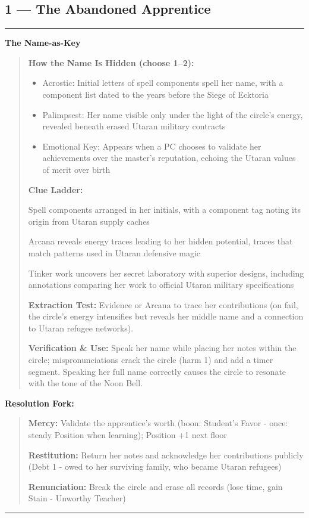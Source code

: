 \documentclass[18pt, letterpaper, twoside]{article}
\newenvironment{floorbox}[1]{%
    \begin{center}
    \begin{minipage}{0.95\textwidth}
    \subsection*{#1}
    \vspace{-0.5em}
    \rule{\textwidth}{0.5pt}
    \vspace{0.5em}
}{%
    \vspace{0.5em}
    \rule{\textwidth}{0.5pt}
    \end{minipage}
    \end{center}
}
\newenvironment{gmnote}[1]{%
    \vspace{0.5em}
    \noindent\textbf{#1}
    \begin{quote}
}{%
    \end{quote}
    \vspace{0.5em}
}
\newenvironment{resolutionbox}{%
    \vspace{0.5em}
    \noindent\textbf{Resolution Fork:}
    \begin{quote}
}{%
    \end{quote}
    \vspace{0.5em}
}
\begin{document}
\begin{floorbox}{1 --- The Abandoned Apprentice}
\begin{gmnote}{The Name-as-Key}
\textbf{How the Name Is Hidden (choose 1--2):}
\begin{itemize}[leftmargin=*]
    \item Acrostic: Initial letters of spell components spell her name, with a component list dated to the years before the Siege of Ecktoria
    \item Palimpsest: Her name visible only under the light of the circle's energy, revealed beneath erased Utaran military contracts
    \item Emotional Key: Appears when a PC chooses to validate her achievements over the master's reputation, echoing the Utaran values of merit over birth
\end{itemize}

\textbf{Clue Ladder:}
\begin{description}[leftmargin=*, style=unboxed]
    \item[Gentle Nudge:] Spell components arranged in her initials, with a component tag noting its origin from Utaran supply caches
    \item[Actionable Lead:] Arcana reveals energy traces leading to her hidden potential, traces that match patterns used in Utaran defensive magic
    \item[Aha! Proof:] Tinker work uncovers her secret laboratory with superior designs, including annotations comparing her work to official Utaran military specifications
\end{description}

\textbf{Extraction Test:} Evidence or Arcana to trace her contributions (on fail, the circle's energy intensifies but reveals her middle name and a connection to Utaran refugee networks).

\textbf{Verification \& Use:} Speak her name while placing her notes within the circle; mispronunciations crack the circle (harm 1) and add a timer segment. Speaking her full name correctly causes the circle to resonate with the tone of the Noon Bell.
\end{gmnote}

\begin{resolutionbox}
\textbf{Mercy:} Validate the apprentice's worth (boon: Student's Favor - once: steady Position when learning); Position +1 next floor

\textbf{Restitution:} Return her notes and acknowledge her contributions publicly (Debt 1 - owed to her surviving family, who became Utaran refugees)

\textbf{Renunciation:} Break the circle and erase all records (lose time, gain Stain - Unworthy Teacher)
\end{resolutionbox}


\end{floorbox}
\end{document}
